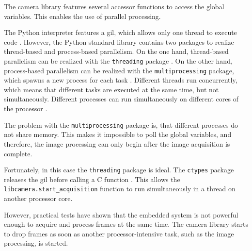 The camera library features several accessor functions to access the global variables.
This enables the use of parallel processing.

The Python interpreter features a \acrfull{gil}, which allows only one thread to execute code \cite{inf_gil}.
However, the Python standard library contains two packages to realize thread-based and process-based parallelism.
On the one hand, thread-based parallelism can be realized with the \texttt{threading} package \cite{inf_threading}.
On the other hand, process-based parallelism can be realized with the \texttt{multiprocessing} package, which spawns a new process for each task \cite{inf_multiprocessing}.
Different threads run concurrently, which means that different tasks are executed at the same time, but not simultaneously.
Different processes can run simultaneously on different cores of the processor \cite{inf_parallelism}.

The problem with the \texttt{multiprocessing} package is, that different processes do not share memory.
This makes it impossible to poll the global variables, and therefore, the image processing can only begin after the image acquisition is complete.

Fortunately, in this case the \texttt{threading} package is ideal.
The \texttt{ctypes} package releases the \acrshort{gil} before calling a C function \cite{inf_ctypes_gil}.
This allows the \texttt{libcamera.start\_acquisition} function to run simultaneously in a thread on another processor core.

However, practical tests have shown that the embedded system is not powerful enough to acquire and process frames at the same time.
The camera library starts to drop frames as soon as another processor-intensive task, such as the image processing, is started.

